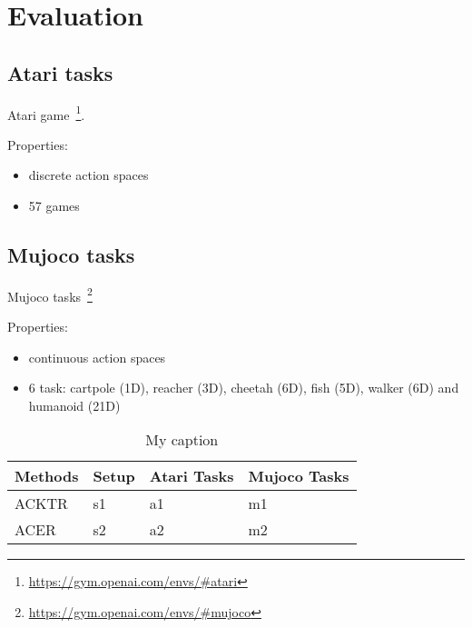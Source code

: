 \section{Evaluation}

\subsection{Atari tasks}
Atari game~\footnote{\url{https://gym.openai.com/envs/\#atari}}.

Properties:
\begin{itemize}
\item discrete action spaces
\item 57 games
\end{itemize}

\subsection{Mujoco tasks}
Mujoco tasks~\footnote{\url{https://gym.openai.com/envs/\#mujoco}}

Properties:
\begin{itemize}
\item continuous action spaces
\item 6 task: cartpole (1D), reacher (3D), cheetah (6D), fish (5D), walker (6D) and humanoid (21D)
\end{itemize}

\begin{table}[]
\centering
\caption{My caption}
\label{my-label}

\begin{tabular}{|l|l|l|l|}
\hline
Methods & Setup & Atari Tasks & Mujoco Tasks \\ \hline
ACKTR   & s1    & a1          & m1           \\ \hline
ACER    & s2    & a2          & m2           \\ \hline
\end{tabular}

\end{table}
